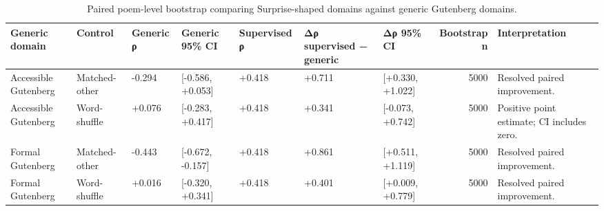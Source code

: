 \begin{table}
\caption{Paired poem-level bootstrap comparing Surprise-shaped domains against generic Gutenberg domains.}
\label{tab:table_6_domain_contrast_bootstrap}
\begin{tabular}{lllllllrl}
\toprule
Generic domain & Control & Generic ρ & Generic 95\% CI & Supervised ρ & Δρ supervised − generic & Δρ 95\% CI & Bootstrap n & Interpretation \\
\midrule
Accessible Gutenberg & Matched-other & -0.294 & [-0.586, +0.053] & +0.418 & +0.711 & [+0.330, +1.022] & 5000 & Resolved paired improvement. \\
Accessible Gutenberg & Word-shuffle & +0.076 & [-0.283, +0.417] & +0.418 & +0.341 & [-0.073, +0.742] & 5000 & Positive point estimate; CI includes zero. \\
Formal Gutenberg & Matched-other & -0.443 & [-0.672, -0.157] & +0.418 & +0.861 & [+0.511, +1.119] & 5000 & Resolved paired improvement. \\
Formal Gutenberg & Word-shuffle & +0.016 & [-0.320, +0.341] & +0.418 & +0.401 & [+0.009, +0.779] & 5000 & Resolved paired improvement. \\
\bottomrule
\end{tabular}
\end{table}

